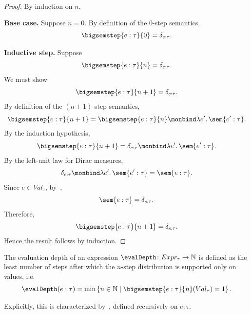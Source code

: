 \begin{proof}
  By induction on $n$.

  \textbf{Base case.}
  Suppose $n = 0$. By definition of the $0$-step semantics,
  \[
    \bigsemstep{e : \tau}{0}
    =
    \delta_{e : \tau}.
  \]

  \textbf{Inductive step.}
  Suppose
  \[
    \bigsemstep{e : \tau}{n}
    =
    \delta_{e : \tau}.
  \]
  We must show
  \[
    \bigsemstep{e : \tau}{n+1}
    =
    \delta_{e : \tau}.
  \]
  By definition of the $(n+1)$-step semantics,
  \[
    \bigsemstep{e : \tau}{n+1}
    =
    \bigsemstep{e : \tau}{n}
    \monbind
    \lambda e'.\,\sem{e' : \tau}.
  \]
  By the induction hypothesis,
  \[
    \bigsemstep{e : \tau}{n+1}
    =
    \delta_{e : \tau}
    \monbind
    \lambda e'.\,\sem{e' : \tau}.
  \]
  By the left-unit law for Dirac measures,
  \[
    \delta_{e : \tau}
    \monbind
    \lambda e'.\,\sem{e' : \tau}
    =
    \sem{e : \tau}.
  \]
  Since $e \in Val_\tau$, by~,
  \[
    \sem{e : \tau} = \delta_{e : \tau}.
  \]
  Therefore,
  \[
    \bigsemstep{e : \tau}{n+1}
    =
    \delta_{e : \tau}.
  \]
  Hence the result follows by induction.
\end{proof}

\begin{definition}\label{def:eval-depth}
  The evaluation depth of an expression $\evalDepth \colon Expr_{\tau} \to \mathbb{N}$ is defined as the least number of steps after which the $n$-step distribution is supported only on values, i.e.
  \[
    \evalDepth(e : \tau)
    =
    \min \left\{
      n \in \mathbb{N}
      \mid
      \bigsemstep{e : \tau}{n}(Val_\tau) = 1
    \right\}.
  \]

  Explicitly, this is characterized by~, defined recursively on $e : \tau$.
\end{definition}

